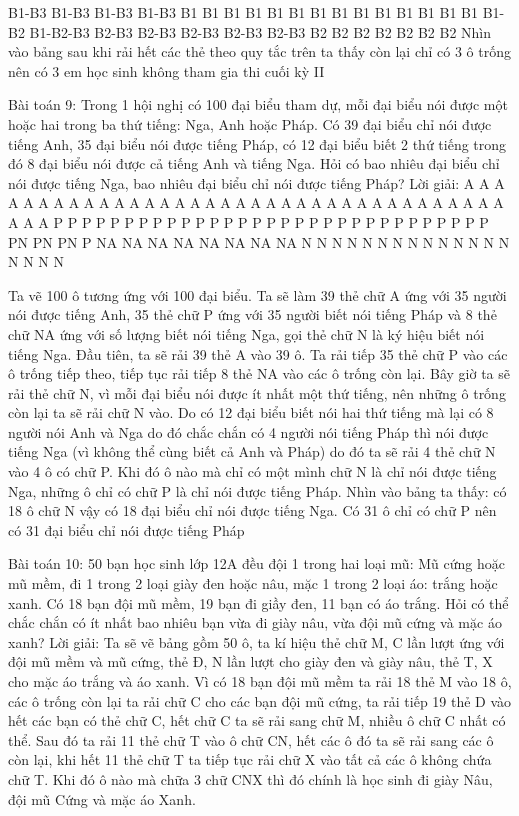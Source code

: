 \begin{multicols}{2}
	B1-B3	B1-B3	B1-B3	B1-B3	B1	B1	B1
	B1	B1	B1	B1	B1	B1	B1
	B1	B1	B1	B1	B1-B2	B1-B2-B3	B2-B3
	B2-B3	B2-B3	B2-B3	B2-B3	B2	B2	B2
	B2	B2	B2	B2			
	Nhìn vào bảng sau khi rải hết các thẻ theo quy tắc trên ta thấy còn lại chỉ có 3 ô trống nên có 3 em học sinh không tham gia thi cuối kỳ II
	
	Bài toán 9: Trong 1 hội nghị có 100 đại biểu tham dự, mỗi đại biểu nói được một hoặc hai trong ba thứ tiếng: Nga, Anh hoặc Pháp. Có 39 đại biểu chỉ nói được tiếng Anh, 35 đại biểu nói được tiếng Pháp, có 12 đại biểu biết 2 thứ tiếng trong đó 8 đại biểu nói được cả tiếng Anh và tiếng Nga. Hỏi có bao nhiêu đại biểu chỉ nói được tiếng Nga, bao nhiêu đại biểu chỉ nói được tiếng Pháp?
	Lời giải:
	A	A	A	A	A	A	A	A	A	A
	A	A	A	A	A	A	A	A	A	A
	A	A	A	A	A	A	A	A	A	A
	A	A	A	A	A	A	A	A	A	P
	P	P	P	P	P	P	P	P	P	P
	P	P	P	P	P	P	P	P	P	P
	P	P	P	P	P	P	P	P	P	P
	PN	PN	PN	P	NA	NA	NA	NA	NA	NA
	NA	NA	N	N	N	N	N	N	N	N
	N	N	N	N	N	N	N	N	N	N
	
	Ta vẽ 100 ô tương ứng với 100 đại biểu. Ta sẽ làm 39 thẻ chữ A ứng với 35 người nói được tiếng Anh, 35 thẻ chữ P ứng với 35 người biết nói tiếng Pháp và 8 thẻ chữ NA ứng với số lượng biết nói tiếng Nga, gọi thẻ chữ N là ký hiệu biết nói tiếng Nga.
	Đầu tiên, ta sẽ rải 39 thẻ A vào 39 ô. Ta rải tiếp 35 thẻ chữ P vào các ô trống tiếp theo, tiếp tục rải tiếp 8 thẻ NA vào các ô trống còn lại. Bây giờ ta sẽ rải thẻ chữ N, vì mỗi đại biểu nói được ít nhất một thứ tiếng, nên những ô trống còn lại ta sẽ rải chữ N vào. Do có 12 đại biểu biết nói hai thứ tiếng mà lại có 8 người nói Anh và Nga do đó chắc chắn có 4 người nói tiếng Pháp thì nói được tiếng Nga (vì không thể cùng biết cả Anh và Pháp) do đó ta sẽ rải 4 thẻ chữ N vào 4 ô có chữ P. Khi đó ô nào mà chỉ có một mình chữ N là chỉ nói được tiếng Nga, những ô chỉ có chữ P là chỉ nói được tiếng Pháp. Nhìn vào bảng ta thấy: có 18 ô chữ N vậy có 18 đại biểu chỉ nói được tiếng Nga. Có 31 ô chỉ có chữ P nên có 31 đại biểu chỉ nói được tiếng Pháp
	
	Bài toán 10: 50 bạn học sinh lớp 12A đều đội 1 trong hai loại mũ: Mũ cứng hoặc mũ mềm, đi 1 trong 2 loại giày đen hoặc nâu, mặc 1 trong 2 loại áo: trắng hoặc xanh. Có 18 bạn đội mũ mềm, 19 bạn đi giầy đen, 11 bạn có áo trắng. Hỏi có thể chắc chắn có ít nhất bao nhiêu bạn vừa đi giày nâu, vừa đội mũ cứng và mặc áo xanh?
	Lời giải:
	Ta sẽ vẽ bảng gồm 50 ô, ta kí hiệu thẻ chữ M, C lần lượt ứng với đội mũ mềm và mũ cứng, thẻ Đ, N lần lượt cho giày đen và giày nâu, thẻ T, X cho mặc áo trắng và áo xanh.
	Vì có 18 bạn đội mũ mềm ta rải 18 thẻ M vào 18 ô, các ô trống còn lại ta rải chữ C cho các bạn đội mũ cứng, ta rải tiếp 19 thẻ D vào hết các bạn có thẻ chữ C, hết chữ C ta sẽ rải sang chữ M, nhiều ô chữ C nhất có thể. Sau đó ta rải 11 thẻ chữ T vào ô chữ CN, hết các ô đó ta sẽ rải sang các ô còn lại, khi hết 11 thẻ chữ T ta tiếp tục rải chữ X vào tất cả các ô không chứa chữ T. Khi đó ô nào mà chữa 3 chữ CNX thì đó chính là học sinh đi giày Nâu, đội mũ Cứng và mặc áo Xanh.
	

\end{multicols}
